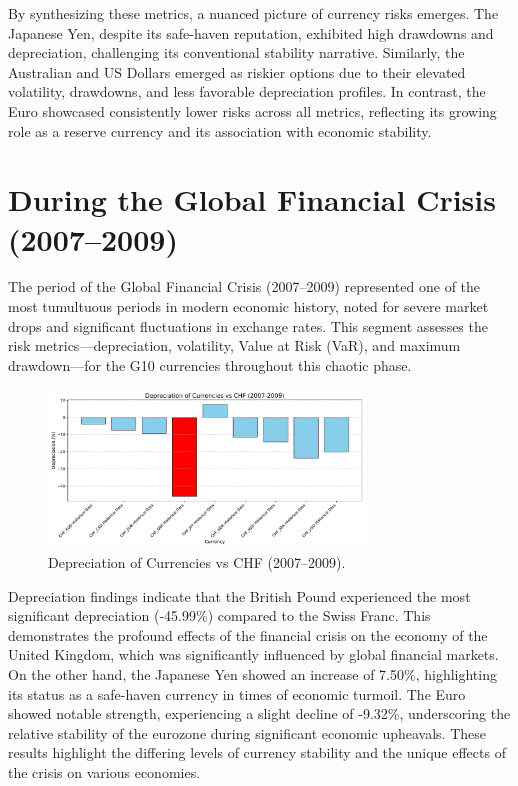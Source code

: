\documentclass[11pt,a4paper,english,oneside]{book}
\begin{document}
By synthesizing these metrics, a nuanced picture of currency risks emerges. The Japanese Yen, despite its safe-haven reputation, exhibited high drawdowns and depreciation, challenging its conventional stability narrative. Similarly, the Australian and US Dollars emerged as riskier options due to their elevated volatility, drawdowns, and less favorable depreciation profiles. In contrast, the Euro showcased consistently lower risks across all metrics, reflecting its growing role as a reserve currency and its association with economic stability.

\section{During the Global Financial Crisis (2007–2009)}
The period of the Global Financial Crisis (2007–2009) represented one of the most tumultuous periods in modern economic history, noted for severe market drops and significant fluctuations in exchange rates. This segment assesses the risk metrics—depreciation, volatility, Value at Risk (VaR), and maximum drawdown—for the G10 currencies throughout this chaotic phase.

\begin{figure}[h!]
    \centering
    \includegraphics[width=0.75\textwidth]{../../images/depreciation_2007_2009.pdf}
    \caption{Depreciation of Currencies vs CHF (2007--2009).}
    \label{fig:depreciation_2007_2009}
\end{figure}

Depreciation findings indicate that the British Pound experienced the most significant depreciation (-45.99\%) compared to the Swiss Franc. This demonstrates the profound effects of the financial crisis on the economy of the United Kingdom, which was significantly influenced by global financial markets. On the other hand, the Japanese Yen showed an increase of 7.50\%, highlighting its status as a safe-haven currency in times of economic turmoil. The Euro showed notable strength, experiencing a slight decline of -9.32\%, underscoring the relative stability of the eurozone during significant economic upheavals. These results highlight the differing levels of currency stability and the unique effects of the crisis on various economies.
\end{document}
